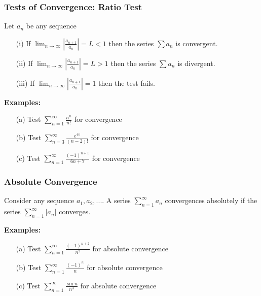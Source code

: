 \documentclass{beamer}
\begin{document}
\begin{frame}
\frametitle{Tests of Convergence: Ratio Test}
Let $a_n$ be any sequence
\begin{itemize}
	\item[(i)] If $\lim_{n\to \infty} |\frac{a_{n+1}}{a_n}| = L < 1$ then the series $\sum a_n$ is convergent.
	\item[(ii)] If $\lim_{n\to \infty} |\frac{a_{n+1}}{a_n}| = L > 1$ then the series $\sum a_n$ is divergent.
	\item[(iii)] If $\lim_{n\to \infty} |\frac{a_{n+1}}{a_n}| =  1$ then the test fails.
\end{itemize}

\vspace{12pt}
\textbf{Examples:}
\begin{itemize}
	\item[(a)] Test $\sum_{n=1}^\infty \frac{n^n}{n!}$ for convergence
	\item[(b)] Test $\sum_{n=3}^\infty \frac{e^{4n}}{(n-2)!}$ for convergence
	\item[(c)] Test $\sum_{n=1}^\infty \frac{(-1)^{n+1}}{6n+7}$ for convergence
\end{itemize}
\end{frame}

\begin{frame}
\frametitle{Absolute Convergence}
Consider any sequence $a_1, a_2,...$. A series $\sum_{n=1}^\infty a_n$ convergences absolutely if the series $\sum_{n=1}^\infty |a_n|$ converges.

\vspace{12pt}
\textbf{Examples:}
\begin{itemize}
	\item[(a)] Test $\sum_{n=1}^\infty \frac{(-1)^{n+2}}{n^2}$ for absolute convergence
	\item[(b)]  Test $\sum_{n=1}^\infty \frac{(-1)^n}{n}$ for absolute convergence
	\item[(c)] Test $\sum_{n=1}^\infty \frac{\sin n}{n^3}$ for absolute convergence
\end{itemize}
\end{frame}
\end{document}
